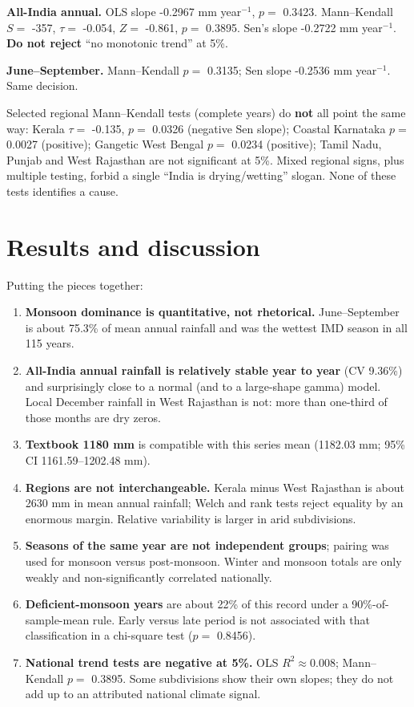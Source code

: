 \documentclass[
]{article}
\providecommand{\tightlist}{%
  \setlength{\itemsep}{0pt}\setlength{\parskip}{0pt}}
\begin{document}
\textbf{All-India annual.} OLS slope -0.2967 mm year\(^{-1}\), \(p=\)
0.3423. Mann--Kendall \(S=\) -357, \(\tau=\) -0.054, \(Z=\) -0.861,
\(p=\) 0.3895. Sen's slope -0.2722 mm year\(^{-1}\). \textbf{Do not
reject} ``no monotonic trend'' at 5\%.

\textbf{June--September.} Mann--Kendall \(p=\) 0.3135; Sen slope -0.2536
mm year\(^{-1}\). Same decision.

Selected regional Mann--Kendall tests (complete years) do \textbf{not}
all point the same way: Kerala \(\tau=\) -0.135, \(p=\) 0.0326 (negative
Sen slope); Coastal Karnataka \(p=\) 0.0027 (positive); Gangetic West
Bengal \(p=\) 0.0234 (positive); Tamil Nadu, Punjab and West Rajasthan
are not significant at 5\%. Mixed regional signs, plus multiple testing,
forbid a single ``India is drying/wetting'' slogan. None of these tests
identifies a cause.

\section{Results and discussion}\label{results-and-discussion}

Putting the pieces together:

\begin{enumerate}
\def\labelenumi{\arabic{enumi}.}
\tightlist
\item
  \textbf{Monsoon dominance is quantitative, not rhetorical.}
  June--September is about 75.3\% of mean annual rainfall and was the
  wettest IMD season in all 115 years.
\item
  \textbf{All-India annual rainfall is relatively stable year to year}
  (CV 9.36\%) and surprisingly close to a normal (and to a large-shape
  gamma) model. Local December rainfall in West Rajasthan is not: more
  than one-third of those months are dry zeros.
\item
  \textbf{Textbook 1180 mm} is compatible with this series mean (1182.03
  mm; 95\% CI 1161.59--1202.48 mm).
\item
  \textbf{Regions are not interchangeable.} Kerala minus West Rajasthan
  is about 2630 mm in mean annual rainfall; Welch and rank tests reject
  equality by an enormous margin. Relative variability is larger in arid
  subdivisions.
\item
  \textbf{Seasons of the same year are not independent groups}; pairing
  was used for monsoon versus post-monsoon. Winter and monsoon totals
  are only weakly and non-significantly correlated nationally.
\item
  \textbf{Deficient-monsoon years} are about 22\% of this record under a
  90\%-of-sample-mean rule. Early versus late period is not associated
  with that classification in a chi-square test (\(p=\) 0.8456).
\item
  \textbf{National trend tests are negative at 5\%.} OLS
  \(R^2\approx 0.008\); Mann--Kendall \(p=\) 0.3895. Some subdivisions
  show their own slopes; they do not add up to an attributed national
  climate signal.
\end{enumerate}
\end{document}
